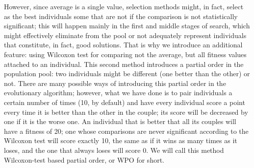 \documentclass{llncs}
\begin{document}
However, since average is a single value, selection methods might, in
fact, select as the best individuals some that are not if the comparison
is not statistically significant; this will happen mainly in the first
and middle stages of search, which might effectively eliminate from
the pool or not adequately represent individuals that constitute, in
fact, good solutions. That is why we introduce an additional feature:
using Wilcoxon test \cite{wilcoxon:1945}
for comparing not the average, but all
fitness values attached to an individual. This second method
introduces a partial order in the population pool: two individuals
might be different (one better than the other) or not. There are many
possible ways of introducing this partial order in the evolutionary
algorithm; however, what we have done is to pair individuals a certain
number of times (10, by default) and have every individual score a
point every time it is better than the other in the couple; its score
will be decreased by one if it is the worse one. An individual that is better
that all its couples will have a fitness of 20; one whose comparisons
are never significant according to the Wilcoxon test will score
exactly 10, the same as if it wins as many times as it loses, and the
one that always loses will score 0. We will call this method
Wilcoxon-test based partial order, or {\sf WPO} for short.
%
\end{document}
